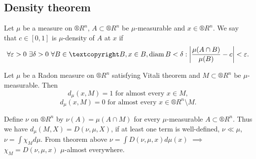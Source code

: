 \documentclass[12pt]{article}					%
\begin{document}
\subsection{Density theorem}

\begin{definice}
	Let $\mu$ be a measure on $®R^n$, $A \subset ®R^n$ be $\mu$-measurable and $x \in ®R^n$. We say that $c \in [0, 1]$ is $\mu$-density of $A$ at $x$ if
	$$ \forall \epsilon > 0\ \exists \delta > 0\ \forall B \in ©B, x \in B, \diam B < \delta: \left|\frac{\mu(A \cap B)}{\mu(B)} - c\right|<\epsilon. $$
\end{definice}

\begin{veta}
	Let $\mu$ be a Radon measure on $®R^n$ satisfying Vitali theorem and $M \subset ®R^n$ be $\mu$-measurable. Then
	$$ d_\mu(x, M) = 1 \text{ for almost every } x \in M, $$
	$$ d_\mu(x, M) = 0 \text{ for almost every } x \in ®R^n\setminus M. $$
	
	\begin{dukazin}
		Define $\nu$ on $®R^n$ by $\nu(A) = \mu(A \cap M)$ for every $\mu$-measurable $A \subset ®R^n$. Thus we have $d_\mu(M, X) = D(\nu, \mu, X)$, if at least one term is well-defined, $\nu \ll \mu$, $\nu = \int \chi_M d\mu$. From theorem above $\nu = \int D(\nu, \mu, x) d\mu(x)$ $\implies$ $\chi_M = D(\nu, \mu, x)$ $\mu$-almost everywhere.
	\end{dukazin}
\end{veta}
\end{document}
